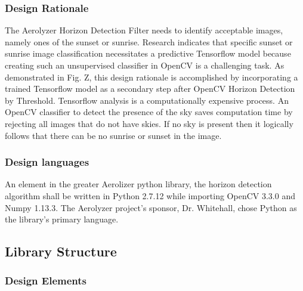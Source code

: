 \documentclass[onecolumn, draftclsnofoot,10pt, compsoc]{IEEEtran}
\begin{document}
\begin{singlespace}
      \subsubsection{Design Rationale}
      	The Aerolyzer Horizon Detection Filter needs to identify acceptable images, namely ones of the sunset or sunrise. Research indicates that specific sunset or sunrise image classification  necessitates a predictive Tensorflow model because creating such an unsupervised classifier in OpenCV is a challenging task. As demonstrated in Fig. Z, this design rationale is accomplished by incorporating a trained Tensorflow model as a secondary step after OpenCV Horizon Detection by Threshold. Tensorflow analysis is a computationally expensive process. An OpenCV classifier to detect the presence of the sky saves computation time by rejecting all images that do not have skies. If no sky is present then it logically follows that there can be no sunrise or sunset in the image.

      \subsubsection{Design languages}
      	An element in the greater Aerolizer python library, the horizon detection algorithm shall be written in Python 2.7.12 while importing OpenCV 3.3.0 and Numpy 1.13.3. The Aerolyzer project’s sponsor, Dr. Whitehall, chose Python as the library’s primary language. 

	\subsection{Library Structure}\label{des:LibStructure}
      \subsubsection{Design Elements}

\end{singlespace}
\end{document}
